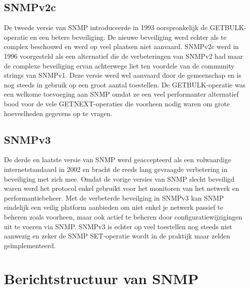 

\subsection{SNMPv2c}
De tweede versie van SNMP introduceerde in 1993 \cite{snmp-versions} oorspronkelijk de GETBULK-operatie en een betere beveiliging.
De nieuwe beveiliging werd echter als te complex beschouwd en werd op veel plaatsen niet aanvaard.
SNMPv2c werd in 1996 \cite{snmp-versions} voorgesteld als een alternatief die de verbeteringen van SNMPv2 had maar de complexe beveiliging ervan achterwege liet
ten voordele van de community strings van SNMPv1.
Deze versie werd wel aanvaard door de gemeenschap en is nog steeds in gebruik op een groot aantal toestellen.
De GETBULK-operatie was een welkome toevoeging aan SNMP omdat ze een veel performanter alternatief bood voor de vele GETNEXT-operaties
die voorheen nodig waren om grote hoeveelheden gegevens op te vragen.



\subsection{SNMPv3}
De derde en laatste versie van SNMP werd geaccepteerd als een volwaardige internetstandaard in 2002 \cite{snmpv3} en
bracht de reeds lang gevraagde verbetering in beveiliging met zich mee.
Omdat de vorige versies van SNMP slecht beveiligd waren werd het protocol enkel gebruikt voor het monitoren van het netwerk en performantiebeheer.
Met de verbeterde beveilging in SNMPv3 kan SNMP eindelijk een veilig platform aanbieden om niet enkel je netwerk passief te beheren zoals voorheen,
maar ook actief te beheren door configuratiewijzigingen uit te voeren via SNMP.
SNMPv3 is echter op veel toestellen nog steeds niet aanwezig en zeker de SNMP SET-operatie wordt in de praktijk maar zelden geïmplementeerd.

\section{Berichtstructuur van SNMP}

